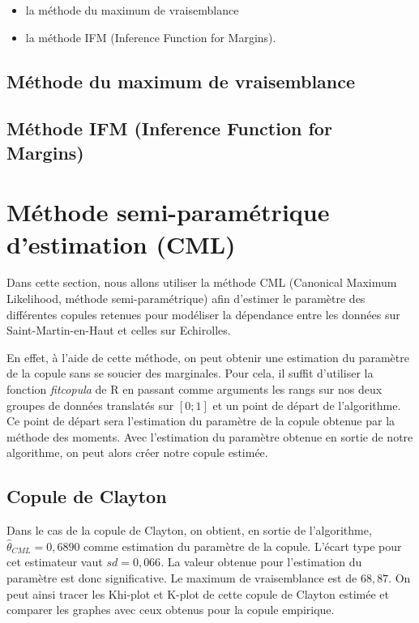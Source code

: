 \begin{itemize}
\item la méthode du maximum de vraisemblance
\item la méthode IFM (Inference Function for Margins).
\end{itemize}

\subsection{Méthode du maximum de vraisemblance}

\subsection{Méthode IFM (Inference Function for Margins)}


\section{Méthode semi-paramétrique d'estimation (CML)}

Dans cette section, nous allons utiliser la méthode CML (Canonical Maximum Likelihood, méthode semi-paramétrique) afin d'estimer le paramètre des différentes copules retenues pour modéliser la dépendance entre les données sur Saint-Martin-en-Haut et celles sur Echirolles.

En effet, à l'aide de cette méthode, on peut obtenir une estimation du paramètre de la copule sans se soucier des marginales. Pour cela, il suffit d'utiliser la fonction \textit{fitcopula} de R en passant comme arguments les rangs sur nos deux groupes de données translatés sur $[0;1]$ et un point de départ de l'algorithme. Ce point de départ sera l'estimation du paramètre de la copule obtenue par la méthode des moments. Avec l'estimation du paramètre obtenue en sortie de notre algorithme, on peut alors créer notre copule estimée.

\subsection{Copule de Clayton}

Dans le cas de la copule de Clayton, on obtient, en sortie de l'algorithme, $\widehat{\theta}_{CML}=0,6890$ comme estimation du paramètre de la copule. L'écart type pour cet estimateur vaut $sd = 0,066$. La valeur obtenue pour l'estimation du paramètre est donc significative. Le maximum de vraisemblance est de $68,87$. 
On peut ainsi tracer les Khi-plot et K-plot de cette copule de Clayton estimée et comparer les graphes avec ceux obtenus pour la copule empirique.

